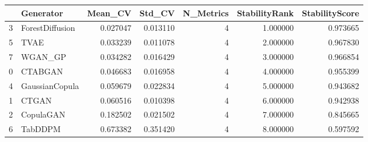 \begin{tabular}{llrrrrr}
\toprule
 & Generator & Mean_CV & Std_CV & N_Metrics & StabilityRank & StabilityScore \\
\midrule
3 & ForestDiffusion & 0.027047 & 0.013110 & 4 & 1.000000 & 0.973665 \\
5 & TVAE & 0.033239 & 0.011078 & 4 & 2.000000 & 0.967830 \\
7 & WGAN_GP & 0.034282 & 0.016429 & 4 & 3.000000 & 0.966854 \\
0 & CTABGAN & 0.046683 & 0.016958 & 4 & 4.000000 & 0.955399 \\
4 & GaussianCopula & 0.059679 & 0.022834 & 4 & 5.000000 & 0.943682 \\
1 & CTGAN & 0.060516 & 0.010398 & 4 & 6.000000 & 0.942938 \\
2 & CopulaGAN & 0.182502 & 0.021502 & 4 & 7.000000 & 0.845665 \\
6 & TabDDPM & 0.673382 & 0.351420 & 4 & 8.000000 & 0.597592 \\
\bottomrule
\end{tabular}
